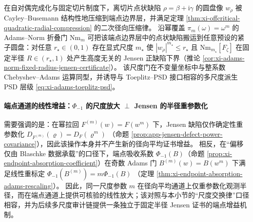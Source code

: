 \begin{theorem}\label{thm:xi-symmetry-audit-tension-scaled}
在自对偶完成化与固定切片制度下，离切片点状缺陷 \(\rho=\beta+\mathrm{i}\gamma\) 的圆盘像 \(w_\rho\) 被 Cayley--Busemann 结构性地压缩到端点边界层，并满足定理 \ref{thm:xi-offcritical-quadratic-radial-compression} 的二次径向压缩律。
沿幂覆盖 \(\pi_m(\omega)=\omega^m\) 的 Adams--Norm 折叠门 \(\mathrm{Nm}_m\) 可把该端点边界层中的点状缺陷搬运到任意预设的紧子圆盘：对任意 \(r_\star\in(0,1)\) 存在显式尺度 \(m_\star\) 使 \(|w_\rho|^{m_\star}\le r_\star\) 且 \(\mathrm{Nm}_{m_\star}[F_\zeta]\) 在固定半径 \(R\in(r_\star,1)\) 处产生高度无关的 Jensen 正缺陷下界（推论 \ref{cor:xi-adams-norm-fixed-radius-jensen-certificate}）。
该尺度门在不变量坐标中与整系数 Chebyshev--Adams 运算同型，并诱导与 Toeplitz--PSD 接口相容的多尺度派生 PSD 层级 \eqref{eq:xi-adams-toeplitz-psd}。
\end{theorem}

\paragraph{端点通道的线性增益：\texorpdfstring{$\Phi_{-1}$}{Phi-1} 的尺度放大 \texorpdfstring{$\perp$}{⊥} Jensen 的半径重参数化}
需要强调的是：在幂拉回 \(F^{(m)}(w)=F(w^m)\) 下，Jensen 缺陷仅作确定性重参数化
\(
D_{F^{(m)}}(\varrho)=D_F(\varrho^m)
\)
（命题 \ref{prop:app-jensen-defect-power-covariance}），因此该操作本身并不产生新的径向平均证书增益。
相反，在“偏移仅由 Blaschke 数据承载”的口径下，端点吸收系数 \(\Phi_{-1}(B)\)（命题 \ref{prop:xi-endpoint-absorption-coefficient}）在奇数 Adams 门
\(
B^{(m)}(w)=B(w^m)
\)
下满足线性重标定
\(
\Phi_{-1}(B^{(m)})=m\Phi_{-1}(B)
\)
（定理 \ref{thm:xi-endpoint-absorption-adams-rescaling}）。
因此，同一尺度参数 \(m\) 在径向平均通道上仅重参数化观测半径，而在端点通道上提供可核验的线性放大；该对照与本小节的“尺度交换律”口径相容，并为后续多尺度审计链提供一条独立于固定半径 Jensen 证书的端点增益机制。

\endinput
